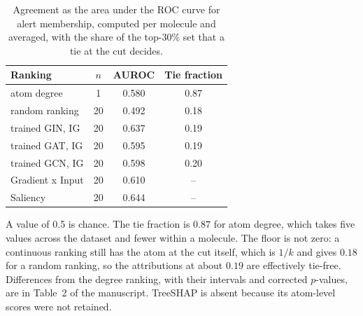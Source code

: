 \begin{table}[htbp]
\centering
\caption{Agreement as the area under the ROC curve for alert membership, computed per molecule and averaged, with the share of the top-30\% set that a tie at the cut decides.}
\label{tab:auroc}
\small
\setlength{\tabcolsep}{4pt}
\begin{tabular}{lccc}
\toprule
Ranking & $n$ & AUROC & Tie fraction \\
\midrule
atom degree & 1 & 0.580 & 0.87 \\
random ranking & 20 & 0.492 & 0.18 \\
trained GIN, IG & 20 & 0.637 & 0.19 \\
trained GAT, IG & 20 & 0.595 & 0.19 \\
trained GCN, IG & 20 & 0.598 & 0.20 \\
Gradient x Input & 20 & 0.610 & -- \\
Saliency & 20 & 0.644 & -- \\
\bottomrule
\end{tabular}
\begin{flushleft}\footnotesize A value of 0.5 is chance. The tie fraction is $0.87$ for atom degree, which takes five values across the dataset and fewer within a molecule. The floor is not zero: a continuous ranking still has the atom at the cut itself, which is $1/k$ and gives $0.18$ for a random ranking, so the attributions at about $0.19$ are effectively tie-free. Differences from the degree ranking, with their intervals and corrected $p$-values, are in Table~2 of the manuscript. TreeSHAP is absent because its atom-level scores were not retained.\end{flushleft}
\end{table}
